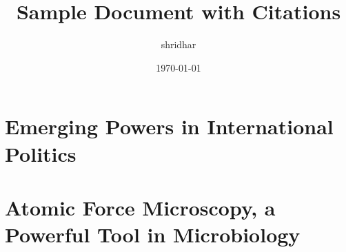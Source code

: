 \documentclass{article}
\begin{document}
	
	\title{Sample Document with Citations}
	\author{shridhar}
	\date{\today}
	\maketitle
	
	\section{Emerging Powers in International Politics}
	\lipsum[1]
	
	
	\section{Atomic Force Microscopy, a Powerful Tool in Microbiology}
	\lipsum[2]
	
	\nocite{*}
	
	
	
\end{document}
